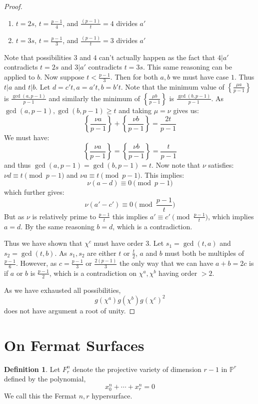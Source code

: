 \documentclass{article}
\renewcommand{\P}{\mathbb{P}}
\newcommand{\frp}[2]{\left\{\frac{#1}{#2}\right\}}
\theoremstyle{definition}
\theoremstyle{definition}
\newtheorem{definition}[theorem]{Definition}
\theoremstyle{remark}
\begin{document}
\begin{proof}
\begin{enumerate}
\item $t  = 2s$, $t = \frac{p-1}{4}$, and $\frac{(p-1)}{t} = 4$ divides $a'$
\item $t = 3s$, $t = \frac{p-1}{3}$, and $\frac{(p-1)}{t} = 3$ divides $a'$
\end{enumerate}
Note that possibilities $3$ and $4$ can't actually happen as the fact that $4 | a'$ contradicts $t = 2s$ and $3|a'$ contradicts $t = 3s$. This same reasoning can be applied to $b$. Now suppose $t < \frac{p-1}{3}$. Then for both $a,b$ we must have case $1$. Thus $t | a$ and $t | b$. Let $d = c't, a = a't, b = b't$. Note that the minimum value of $\frp{\mu a}{p-1}$ is $\frac{\gcd(a,p-1)}{p-1}$ and similarly the minimum of $\frp{\mu b}{p-1}$ is $\frac{\gcd(b,p-1)}{p-1}$. As $\gcd(a, p -1), \gcd(b, p -1) \ge t$ and taking $\mu = \nu$ gives us:
\[\frp{\nu a}{p-1} + \frp{\nu b}{p-1} = \frac{2t}{p-1}\]
We must have:
\[\frp{\nu a}{p-1} = \frp{\nu b}{p-1} = \frac{t}{p-1}\]
and thus $\gcd(a, p -1)=\gcd(b, p -1)=t$. Now note that $\nu$ satisfies: $\nu d \equiv t \pmod{p-1}$ and $\nu a \equiv t \pmod{p-1}$. This implies:
\[\nu(a - d) \equiv 0 \pmod{p-1}\]
which further gives:
\[\nu(a' - c') \equiv 0 \pmod{\frac{p-1}{t}}\]
But as $\nu$ is relatively prime to $\frac{p-1}{t}$ this implies $a' \equiv c' \pmod{\frac{p-1}{t}}$, which implies $a = d$. By the same reasoning $b = d$, which is a contradiction.
\par
Thus we have shown that $\chi^c$ must have order $3$. Let $s_1 = \gcd(t,a)$ and $s_2 = \gcd(t,b)$. As $s_1, s_2$ are either $t$ or $\frac{t}{2}$, $a$ and $b$ must both be multiples of $\frac{p-1}{6}$. However, as $c = \frac{p-1}{3}$ or $\frac{2(p-1)}{3}$ the only way that we can have $a+b=2c$ is if $a$ or $b$ is $\frac{p-1}{2}$, which is a contradiction on $\chi^a, \chi^b$ having order $> 2$.
\par
As we have exhausted all possibilities, 
\[g(\chi^a)g(\chi^b)g(\chi^c)^2\]
does not have argument a root of unity.
\end{proof}

\section{On Fermat Surfaces}

\begin{definition}
Let $F^n_r$ denote the projective variety of dimension $r-1$ in $\P^r$ defined by the polynomial,
\[ x_0^n + \cdots + x_r^n = 0 \] 
We call this the Fermat $n,r$ hypersurface.
\end{definition}
\end{document}
